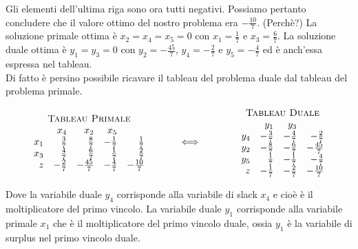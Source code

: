 \documentclass[10pt]{article}
\begin{document}
Gli elementi dell'ultima riga
sono ora tutti negativi.
Possiamo pertanto concludere che il valore ottimo del nostro
problema era $-\frac{10}{7}$.
(Perch\`e?)
La soluzione primale ottima \`e $x_2=x_4=x_5 = 0$
con $x_1=\frac{1}{7}$ e $x_3=\frac{6}{7}$.
La soluzione duale ottima \`e $y_1 = y_3 = 0$
con $y_2=-\frac{45}{7}$, $y_4=-\frac{2}{7}$ e $y_5=-\frac{4}{7}$
ed \`e anch'essa espressa nel tableau.\\

Di fatto \`e persino possibile ricavare
il tableau del problema duale
dal tableau del problema primale.

\[
   \begin{array}{c}
   \mbox{\sc Tableau Primale}\\ 
   \begin{array}{rrrrr}
         & x_4  & x_2 & x_5  \\
      x_1 &  \frac{3}{7} &  \frac{8}{7}  & -\frac{1}{7}  &  \frac{1}{7} \\
      x_3 &  \frac{4}{7} &  \frac{6}{7}  &  \frac{1}{7}  &  \frac{2}{7} \\
       z  & -\frac{2}{7} & -\frac{45}{7} & -\frac{4}{7}  & -\frac{10}{7} \\
   \end{array}
   \end{array}
\hfill
\hspace{1cm}
{\Huge \Longleftrightarrow}
\hfill
\hspace{1.2cm}
   \begin{array}{c}
   \mbox{\sc Tableau Duale}\\ 
   \begin{array}{rrrr}
         & y_1  & y_3  \\
      y_4 &  -\frac{3}{7} & -\frac{4}{7}  & -\frac{2}{7} \\
      y_2 &  -\frac{8}{7} & -\frac{6}{7}  & -\frac{45}{7}\\
      y_5 &   \frac{1}{7} & -\frac{1}{7}  & -\frac{4}{7} \\
       z  &  -\frac{1}{7} & -\frac{2}{7}  & -\frac{10}{7} \\
   \end{array}
   \end{array}
\]

Dove la variabile duale $y_4$ corrisponde alla variabile
di slack $x_4$ e cio\`e \`e il moltiplicatore del primo vincolo.
La variabile duale $y_1$ corrisponde alla variabile
primale $x_1$ che \`e il moltiplicatore del primo vincolo duale,
ossia $y_1$ \`e la variabile di surplus nel primo vincolo duale. 
\end{document}
